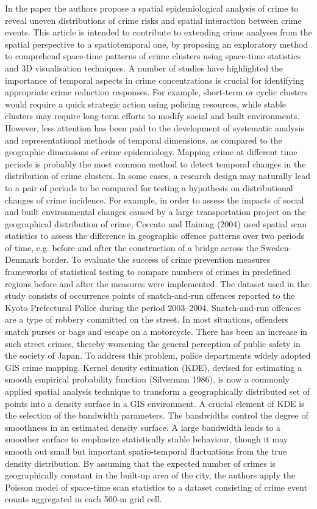 \documentclass{sigkddExp}
\begin{document}
In the paper \cite{visCrime} the authors propose a spatial epidemiological analysis of crime to reveal uneven distributions of crime risks and spatial interaction between crime events. This article is intended to contribute to extending crime analyses from the spatial perspective to a spatiotemporal one, by proposing an exploratory method to comprehend space-time patterns of crime clusters using space-time statistics and 3D visualisation techniques. A number of studies have highlighted the importance of temporal aspects in crime concentrations is crucial for identifying appropriate crime reduction responses. For example, short-term or cyclic clusters would require a quick strategic action using policing resources, while stable clusters may require long-term efforts to modify social and built environments. However, less attention has been paid to the development of systematic analysis and representational methods of temporal dimensions, as compared to the geographic dimensions of crime epidemiology. Mapping crime at different time periods is probably the most common method to detect temporal changes in the distribution of crime clusters. In some cases, a research design may naturally lead to a pair of periods to be compared for testing a hypothesis on distributional changes of crime incidence. For example, in order to assess the impacts of social and built environmental changes caused by a large transportation project on the geographical distribution of crime, Ceccato and Haining (2004) used spatial scan statistics to assess the difference in geographic offence patterns over two periods of time, e.g. before and after the construction of a bridge across the Sweden- Denmark border. To evaluate the success of crime prevention measures frameworks of statistical testing to compare numbers of crimes in predefined regions before and after the measures were implemented. The dataset used in the study consists of occurrence points of snatch-and-run offences reported to the Kyoto Prefectural Police during the period 2003–2004. Snatch-and-run offences are a type of robbery committed on the street. In most situations, offenders snatch purses or bags and escape on a motorcycle. There has been an increase in such street crimes, thereby worsening the general perception of public safety in the society of Japan. To address this problem, police departments widely adopted GIS crime mapping. Kernel density estimation (KDE), devised for estimating a smooth empirical probability function (Silverman 1986), is now a commonly applied spatial analysis technique to transform a geographically distributed set of points into a density surface in a GIS environment. A crucial element of KDE is the selection of the bandwidth parameters. The bandwidths control the degree of smoothness in an estimated density surface. A large bandwidth leads to a smoother surface to emphasize statistically stable behaviour, though it may smooth out small but important spatio-temporal fluctuations from the true density distribution. By assuming that the expected number of crimes is geographically constant in the built-up area of the city, the authors apply the Poisson model of space-time scan statistics to a dataset consisting of crime event counts aggregated in each 500-m grid cell. 
\end{document}
